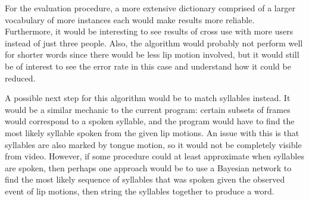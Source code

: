 \documentclass[10pt,twocolumn,letterpaper]{article}
\begin{document}
For the evaluation procedure, a more extensive dictionary comprised of a larger vocabulary of more instances each would make results more reliable. Furthermore, it would be interesting to see results of cross use with more users instead of just three people. Also, the algorithm would probably not perform well for shorter words since there would be less lip motion involved, but it would still be of interest to see the error rate in this case and understand how it could be reduced.

A possible next step for this algorithm would be to match syllables instead. It would be a similar mechanic to the current program: certain subsets of frames would correspond to a spoken syllable, and the program would have to find the most likely syllable spoken from the given lip motions. An issue with this is that syllables are also marked by tongue motion, so it would not be completely visible from video. However, if some procedure could at least approximate when syllables are spoken, then perhaps one approach would be to use a Bayesian network to find the most likely sequence of syllables that was spoken given the observed event of lip motions, then string the syllables together to produce a word.

{\small


}
\end{document}

